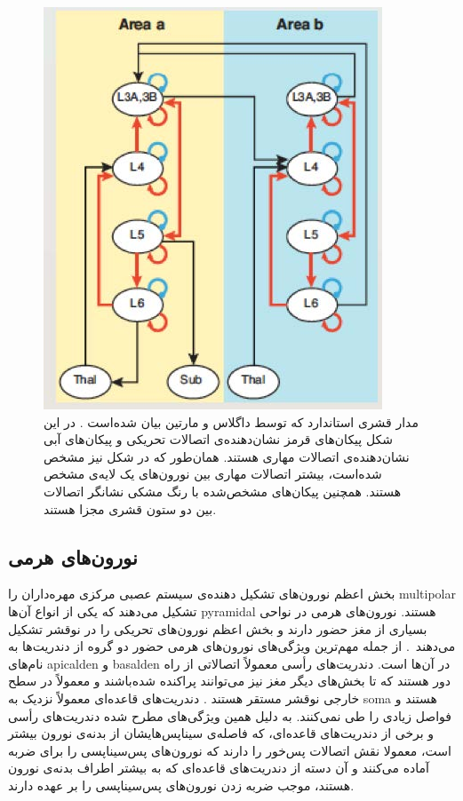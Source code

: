 \documentclass[12pt]{report}
\begin{document}
	\begin{figure}[]
		\centering
		\includegraphics[width=0.6\linewidth]{cc-con.jpg}
		\caption[NS]{
			مدار قشری استاندارد که توسط داگلاس و مارتین بیان شده‌است
			\cite{Douglas2004}.
			در این شکل پیکان‌های قرمز نشان‌دهنده‌ی اتصالات تحریکی و پیکان‌های آبی نشان‌دهنده‌ی اتصالات مهاری هستند. همان‌طور که در شکل نیز مشخص شده‌است، بیشتر اتصالات مهاری بین نورون‌های یک لایه‌ی مشخص هستند. همچنین پیکان‌های مشخص‌شده با رنگ مشکی نشانگر اتصالات بین دو ستون قشری مجزا هستند.
		}
		\label{fig:cc-doganmart}
	\end{figure}
	
	
	\subsection{نورون‌های هرمی}
	
	بخش اعظم نورون‌های تشکیل دهنده‌ی سیستم عصبی مرکزی مهره‌داران را \gls{multipolar}  تشکیل می‌دهند \cite{Kandel2000} که یکی از انواع آن‌ها \gls{pyramidal} هستند. نورون‌های هرمی در نواحی بسیاری از مغز حضور دارند و بخش اعظم نورون‌های تحریکی را در نوقشر تشکیل می‌دهند~\cite{Hawkins2016}.
	از جمله مهم‌ترین ویژگی‌های نورون‌های هرمی حضور دو گروه از دندریت‌ها به نام‌های \gls{apicalden} و \gls{basalden} در آن‌ها است.
	دندریت‌های رأسی معمولاً اتصالاتی از راه دور هستند که تا بخش‌های دیگر مغز نیز می‌توانند پراکنده شده‌باشند و معمولاً در سطح خارجی نوقشر مستقر هستند \cite{MEGIAS2001527}. دندریت‌‌های قاعده‌ای معمولاً نزدیک به \gls{soma} هستند و فواصل زیادی را طی نمی‌کنند. به دلیل همین ویژگی‌های مطرح شده دندریت‌های رأسی و برخی از دندریت‌های قاعده‌ای، که فاصله‌ی سیناپس‌هایشان از بدنه‌ی نورون بیشتر است، معمولا نقش اتصالات پس‌خور را دارند که نورون‌های پس‌سیناپسی را برای ضربه آماده می‌کنند و آن دسته از دندریت‌های قاعده‌ای که به بیشتر اطراف بدنه‌ی نورون هستند، موجب ضربه زدن نورون‌های پس‌سیناپسی را بر عهده دارند.
	
\end{document}
